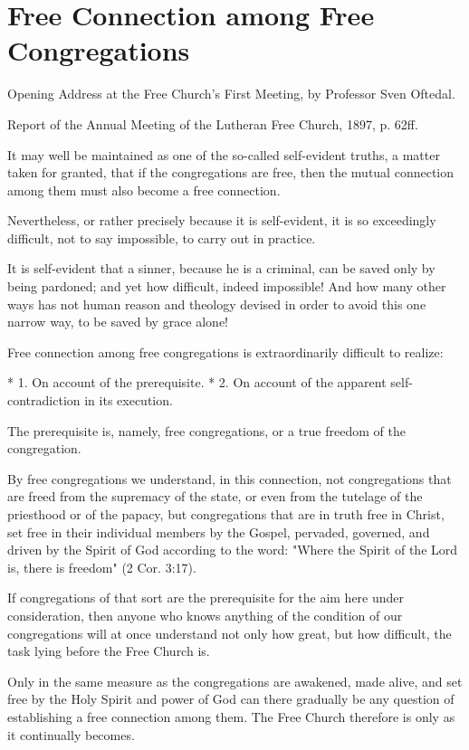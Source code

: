 

\section{Free Connection among Free Congregations}

Opening Address at the Free Church’s First Meeting,
by Professor Sven Oftedal.

Report of the Annual Meeting of the Lutheran Free Church, 1897, p. 62ff.

It may well be maintained as one of the so-called self-evident truths, a matter taken for granted, that if the congregations are free, then the mutual connection among them must also become a free connection.

Nevertheless, or rather precisely because it is self-evident, it is so exceedingly difficult, not to say impossible, to carry out in practice.

It is self-evident that a sinner, because he is a criminal, can be saved only by being pardoned; and yet how difficult, indeed impossible! And how many other ways has not human reason and theology devised in order to avoid this one narrow way, to be saved by grace alone!

Free connection among free congregations is extraordinarily difficult to realize:

* 1. On account of the prerequisite.
* 2. On account of the apparent self-contradiction in its execution.

The prerequisite is, namely, free congregations, or a true freedom of the congregation.

By free congregations we understand, in this connection, not congregations that are freed from the supremacy of the state, or even from the tutelage of the priesthood or of the papacy, but congregations that are in truth free in Christ, set free in their individual members by the Gospel, pervaded, governed, and driven by the Spirit of God according to the word: "Where the Spirit of the Lord is, there is freedom" (2 Cor. 3:17).

If congregations of that sort are the prerequisite for the aim here under consideration, then anyone who knows anything of the condition of our congregations will at once understand not only how great, but how difficult, the task lying before the Free Church is.

Only in the same measure as the congregations are awakened, made alive, and set free by the Holy Spirit and power of God can there gradually be any question of establishing a free connection among them. The Free Church therefore is only as it continually becomes.

